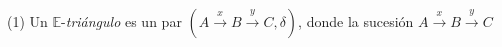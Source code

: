 \documentclass[preview]{standalone}
\begin{document}
\begin{center}
(1) Un $\mathbb{E}$-\emph{triángulo} es un par $(A\xrightarrow{x}B\xrightarrow{y}C,\delta)$, donde la sucesión $A\xrightarrow{x}B\xrightarrow{y}C$\hfill\empty{}
\end{center}
\end{document}
